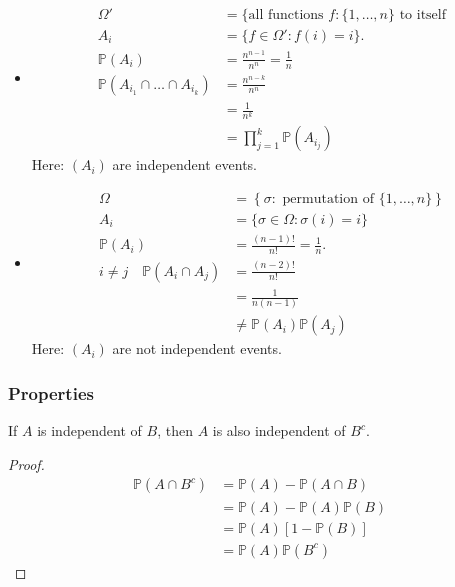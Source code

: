 \begin{example}[Independence] ~\vspace*{-1.5\baselineskip}
    \begin{itemize}
        \item \begin{align*}
            \Omega' &= \{\text{all functions } f : \{1, \dots, n\} \text{ to itself} \\
            A_i &= \{f \in \Omega' : f(i) = i\}. \\
            \mathbb{P}(A_i) &= \frac{n^{n -1}}{n^n} = \frac{1}{n} \\
            \mathbb{P}(A_{i_1} \cap \dots \cap A_{i_k}) &= \frac{n^{n -k}}{n^n} \\
            &= \frac{1}{n^k} \\
            &= \prod_{j = 1}^k \mathbb{P}(A_{i_j})
        \end{align*} 
        Here: $(A_i)$ are independent events.
        \item \begin{align*}
            \Omega &= \left\{\sigma : \text{ permutation of } \{1, \dots, n\} \right\} \\
            A_i &= \{ \sigma \in \Omega : \sigma(i) = i \} \\
            \mathbb{P}(A_i) &= \frac{(n - 1)!}{n!} = \frac{1}{n}. \\
            i \neq j \quad \mathbb{P}(A_i \cap A_j) &= \frac{(n - 2)!}{n!} \\
            &= \frac{1}{n(n - 1)} \\
            &\neq \mathbb{P}(A_i) \mathbb{P}(A_j)
        \end{align*} 
        Here: $(A_i)$ are not independent events.
    \end{itemize} 
\end{example} 

\subsubsection{Properties}
\begin{claim}
    If $A$ is independent of $B$, then $A$ is also independent of $B^c$.
\end{claim} 

\begin{proof}
    \begin{align*}
        \mathbb{P}(A \cap B^c) &= \mathbb{P}(A) - \mathbb{P}(A \cap B) \\
        &= \mathbb{P}(A) - \mathbb{P}(A)\mathbb{P}(B) \\
        &= \mathbb{P}(A) [1 - \mathbb{P}(B)] \\
        &= \mathbb{P}(A) \mathbb{P}(B^c)
    \end{align*}  
\end{proof} 

